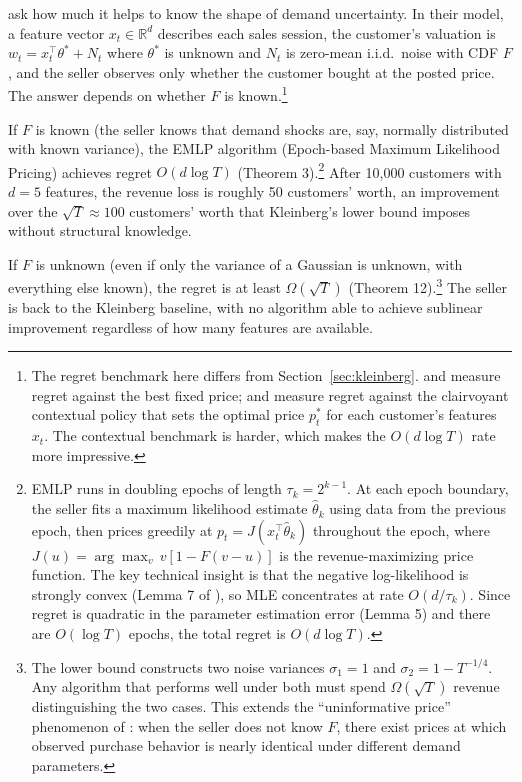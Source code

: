 \citet{Xu2021} ask how much it helps to know the shape of demand uncertainty. In their model, a feature vector $x_t \in \mathbb{R}^d$ describes each sales session, the customer's valuation is $w_t = x_t^\top \theta^* + N_t$ where $\theta^*$ is unknown and $N_t$ is zero-mean i.i.d.\ noise with CDF $F$, and the seller observes only whether the customer bought at the posted price. The answer depends on whether $F$ is known.\footnote{The regret benchmark here differs from Section~\ref{sec:kleinberg}. \citet{Kleinberg2003} and \citet{Broder2012} measure regret against the best fixed price; \citet{Xu2021} and \citet{Liu2024strategic} measure regret against the clairvoyant contextual policy that sets the optimal price $p_t^*$ for each customer's features $x_t$. The contextual benchmark is harder, which makes the $O(d \log T)$ rate more impressive.}

If $F$ is known (the seller knows that demand shocks are, say, normally distributed with known variance), the EMLP algorithm (Epoch-based Maximum Likelihood Pricing) achieves regret $O(d \log T)$ (Theorem 3).\footnote{EMLP runs in doubling epochs of length $\tau_k = 2^{k-1}$. At each epoch boundary, the seller fits a maximum likelihood estimate $\hat{\theta}_k$ using data from the previous epoch, then prices greedily at $p_t = J(x_t^\top \hat{\theta}_k)$ throughout the epoch, where $J(u) = \arg\max_v \, v[1 - F(v - u)]$ is the revenue-maximizing price function. The key technical insight is that the negative log-likelihood is strongly convex (Lemma 7 of \citet{Xu2021}), so MLE concentrates at rate $O(d / \tau_k)$. Since regret is quadratic in the parameter estimation error (Lemma 5) and there are $O(\log T)$ epochs, the total regret is $O(d \log T)$.} After 10,000 customers with $d = 5$ features, the revenue loss is roughly 50 customers' worth, an improvement over the $\sqrt{T} \approx 100$ customers' worth that Kleinberg's lower bound imposes without structural knowledge.

If $F$ is unknown (even if only the variance of a Gaussian is unknown, with everything else known), the regret is at least $\Omega(\sqrt{T})$ (Theorem 12).\footnote{The lower bound constructs two noise variances $\sigma_1 = 1$ and $\sigma_2 = 1 - T^{-1/4}$. Any algorithm that performs well under both must spend $\Omega(\sqrt{T})$ revenue distinguishing the two cases. This extends the ``uninformative price'' phenomenon of \citet{Broder2012}: when the seller does not know $F$, there exist prices at which observed purchase behavior is nearly identical under different demand parameters.} The seller is back to the Kleinberg baseline, with no algorithm able to achieve sublinear improvement regardless of how many features are available.

